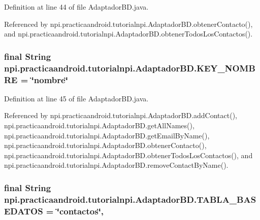 Definition at line 44 of file Adaptador\-B\-D.\-java.



Referenced by npi.\-practicaandroid.\-tutorialnpi.\-Adaptador\-B\-D.\-obtener\-Contacto(), and npi.\-practicaandroid.\-tutorialnpi.\-Adaptador\-B\-D.\-obtener\-Todos\-Los\-Contactos().

\hypertarget{classnpi_1_1practicaandroid_1_1tutorialnpi_1_1_adaptador_b_d_aac27fea036b6e589b6a4a8c2e3d5b596}{
\subsubsection[{K\-E\-Y\-\_\-\-N\-O\-M\-B\-R\-E}]{\setlength{\rightskip}{0pt plus 5cm}final String npi.\-practicaandroid.\-tutorialnpi.\-Adaptador\-B\-D.\-K\-E\-Y\-\_\-\-N\-O\-M\-B\-R\-E = \char`\"{}nombre\char`\"{}\hspace{0.3cm}{\ttfamily [static]}}}\label{classnpi_1_1practicaandroid_1_1tutorialnpi_1_1_adaptador_b_d_aac27fea036b6e589b6a4a8c2e3d5b596}


Definition at line 45 of file Adaptador\-B\-D.\-java.



Referenced by npi.\-practicaandroid.\-tutorialnpi.\-Adaptador\-B\-D.\-add\-Contact(), npi.\-practicaandroid.\-tutorialnpi.\-Adaptador\-B\-D.\-get\-All\-Names(), npi.\-practicaandroid.\-tutorialnpi.\-Adaptador\-B\-D.\-get\-Email\-By\-Name(), npi.\-practicaandroid.\-tutorialnpi.\-Adaptador\-B\-D.\-obtener\-Contacto(), npi.\-practicaandroid.\-tutorialnpi.\-Adaptador\-B\-D.\-obtener\-Todos\-Los\-Contactos(), and npi.\-practicaandroid.\-tutorialnpi.\-Adaptador\-B\-D.\-remove\-Contact\-By\-Name().

\hypertarget{classnpi_1_1practicaandroid_1_1tutorialnpi_1_1_adaptador_b_d_abbf36d9723f1844372402ae083635e3f}{
\subsubsection[{T\-A\-B\-L\-A\-\_\-\-B\-A\-S\-E\-D\-A\-T\-O\-S}]{\setlength{\rightskip}{0pt plus 5cm}final String npi.\-practicaandroid.\-tutorialnpi.\-Adaptador\-B\-D.\-T\-A\-B\-L\-A\-\_\-\-B\-A\-S\-E\-D\-A\-T\-O\-S = \char`\"{}contactos\char`\"{}\hspace{0.3cm}{\ttfamily [static]}, {\ttfamily [private]}}}\label{classnpi_1_1practicaandroid_1_1tutorialnpi_1_1_adaptador_b_d_abbf36d9723f1844372402ae083635e3f}


